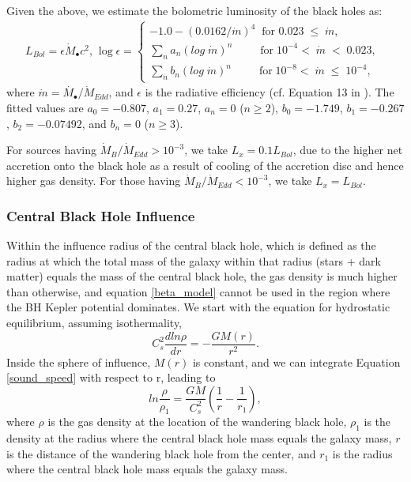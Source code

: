 \documentclass[fleqn,usenatbib,useAMS]{mnras}
\begin{document}
Given the above, we estimate the bolometric luminosity of the black holes as:
\begin{subequations}
    \begin{equation}\label{bol_lum}
        L_{Bol} = \epsilon\dot{M}_{\bullet}c^2,
    \end{equation}
    \begin{equation}\label{rad_eff}
        \begin{split}
        \text{log}\;\epsilon = \begin{cases}
                        -1.0-(0.0162/\dot{m})^{4}\;\;\text{for 0.023}\;\leq\;\dot{m}, \\
                        \sum_{n}{}a_{n}(log\;\dot{m})^{n}\;\;\;\;\;\;\;\;\;\text{for}\;10^{-4} <\;\dot{m}\;<\;0.023, \\
                        \sum_{n}{}b_{n}(log\;\dot{m})^{n}\;\;\;\;\;\;\;\;\;\text{for}\;10^{-8} <\;\dot{m}\;\leq\;10^{-4},
                               \end{cases}
        \end{split}
    \end{equation}
\end{subequations}
where $\dot{m}=\dot{M_{\bullet}}/\dot{M}_{Edd}$, and $\epsilon$ is the radiative efficiency (cf. Equation 13 in \citealt{2019MNRAS.486.5377I}).  The fitted values are $a_0=-0.807$, $a_1=0.27$, $a_n=0$ ($n\geq2$), $b_0=-1.749$, $b_1=-0.267$, $b_2=-0.07492$, and $b_n=0$ ($n\geq3$).

For sources having $\dot{M}_B/\dot{M}_{Edd} > 10^{-3}$, we take $L_x=0.1L_{Bol}$, due to the higher net accretion onto the black hole as a result of cooling of the accretion disc and hence higher gas density.  For those having $\dot{M}_B/\dot{M}_{Edd} < 10^{-3}$, we take $L_x=L_{Bol}$.


\subsubsection{Central Black Hole Influence}
Within the influence radius of the central black hole, which is defined as the radius at which the total mass of the galaxy within that radius (stars + dark matter) equals the mass of the central black hole, the gas density is much higher than otherwise, and equation \eqref{beta_model} cannot be used in the region where the BH Kepler potential dominates.  We start with the equation for hydrostatic equilibrium, assuming isothermality,
\begin{equation} \label{sound_speed}
    C_{s}^2\frac{dln\rho}{dr}= -\frac{GM(r)}{r^2}.
\end{equation}
Inside the sphere of influence, $M(r)$ is constant, and we can integrate Equation \eqref{sound_speed} with respect to r, leading to 
\begin{equation}
    ln\frac{\rho}{\rho_1} = \frac{GM}{C_{s}^2}\left(\frac{1}{r} - \frac{1}{r_1}\right),
\end{equation}
where $\rho$ is the gas density at the location of the wandering black hole, $\rho_1$ is the density at the radius where the central black hole mass equals the galaxy mass, $r$ is the distance of the wandering black hole from the center, and $r_1$ is the radius where the central black hole mass equals the galaxy mass.
\end{document}
